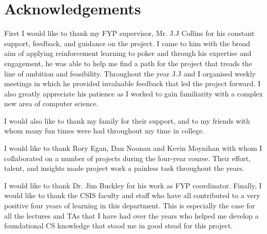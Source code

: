 
\section*{Acknowledgements}\label{sec:acknowledgements}

First I would like to thank my FYP supervisor, Mr. J.J Collins for his
constant support, feedback, and guidance on the project.
I came to him with the broad aim of applying reinforcement learning to poker and through his
expertise and engagement, he was able to help me find a path for the project
that treads the line of ambition and feasibility.
Throughout the year J.J and I organised weekly meetings in
which he provided invaluable feedback that led the project forward.
I also greatly appreciate his patience as I worked to
gain familiarity with a complex new area of computer science.

I would also like to thank my family for their support, and to my friends
with whom many fun times were had throughout my time in college.

I would like to thank Rory Egan, Dan Noonan and Kevin Moynihan with
whom I collaborated on a number of projects during the four-year course.
Their effort, talent, and insights made project work a painless task throughout
the years.

I would like to thank Dr. Jim Buckley for his work as FYP coordinator.
Finally, I would like to thank the CSIS faculty and staff who have all
contributed to a very positive four years of learning in this department. This
is especially the case for all the lectures and TAs that I have had over the
years who helped me develop a foundational CS knowledge that stood me in
good stead for this project.